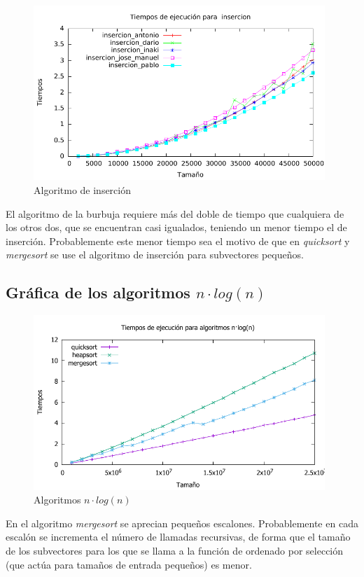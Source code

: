 \documentclass[a4paper, 11pt]{article}
\begin{document}
 \begin{figure}[h] \includegraphics[width=11cm]{insercion_todos_g} \centering
 	\caption{Algoritmo de inserción} \end{figure}

El algoritmo de la burbuja requiere más del doble de tiempo que cualquiera de los otros dos, que se encuentran casi igualados, teniendo un menor tiempo el de inserción. Probablemente este menor tiempo sea el motivo de que en \textit{quicksort} y \textit{mergesort} se use el algoritmo de inserción para subvectores pequeños.

\subsection{Gráfica de los algoritmos $n\cdot log(n)$ }
\begin{figure}[h] \includegraphics[width=11cm]{comparativa_logaritmicos_g} \centering
	\caption{Algoritmos  $n\cdot log(n)$} \end{figure}

En el algoritmo \textit{mergesort} se aprecian pequeños escalones. Probablemente en cada escalón se incrementa el número de llamadas recursivas, de forma que el tamaño de los subvectores para los que se llama a la función de ordenado por selección (que actúa para tamaños de entrada pequeños) es menor. \\
\end{document}
